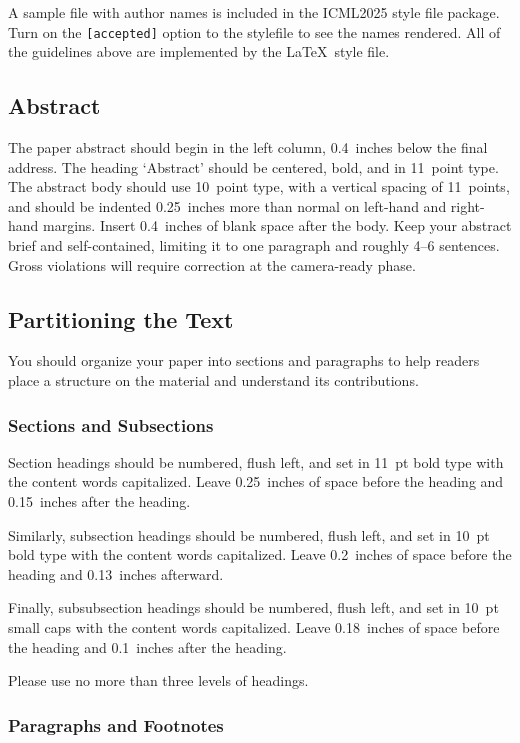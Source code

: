 \documentclass{article}
\theoremstyle{plain}
\theoremstyle{definition}
\theoremstyle{remark}
\begin{document}
A sample file with author names is included in the ICML2025 style file
package. Turn on the \texttt{[accepted]} option to the stylefile to
see the names rendered. All of the guidelines above are implemented
by the \LaTeX\ style file.

\subsection{Abstract}

The paper abstract should begin in the left column, 0.4~inches below the final
address. The heading `Abstract' should be centered, bold, and in 11~point type.
The abstract body should use 10~point type, with a vertical spacing of
11~points, and should be indented 0.25~inches more than normal on left-hand and
right-hand margins. Insert 0.4~inches of blank space after the body. Keep your
abstract brief and self-contained, limiting it to one paragraph and roughly 4--6
sentences. Gross violations will require correction at the camera-ready phase.

\subsection{Partitioning the Text}

You should organize your paper into sections and paragraphs to help
readers place a structure on the material and understand its
contributions.

\subsubsection{Sections and Subsections}

Section headings should be numbered, flush left, and set in 11~pt bold
type with the content words capitalized. Leave 0.25~inches of space
before the heading and 0.15~inches after the heading.

Similarly, subsection headings should be numbered, flush left, and set
in 10~pt bold type with the content words capitalized. Leave
0.2~inches of space before the heading and 0.13~inches afterward.

Finally, subsubsection headings should be numbered, flush left, and
set in 10~pt small caps with the content words capitalized. Leave
0.18~inches of space before the heading and 0.1~inches after the
heading.

Please use no more than three levels of headings.

\subsubsection{Paragraphs and Footnotes}
\end{document}
